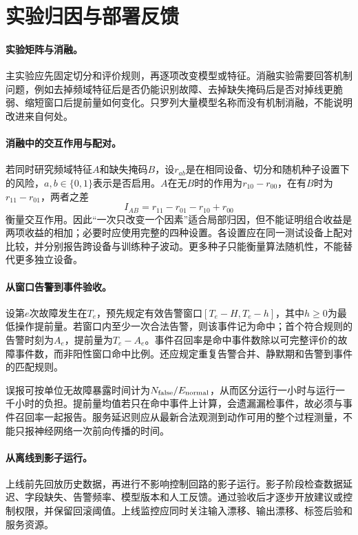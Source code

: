 \section{实验归因与部署反馈}
\paragraph{实验矩阵与消融。}
主实验应先固定切分和评价规则，再逐项改变模型或特征。消融实验需要回答机制问题，例如去掉频域特征后是否仍能识别故障、去掉缺失掩码后是否对掉线更脆弱、缩短窗口后提前量如何变化。只罗列大量模型名称而没有机制消融，不能说明改进来自何处。

\paragraph{消融中的交互作用与配对。}
若同时研究频域特征$A$和缺失掩码$B$，设$r_{ab}$是在相同设备、切分和随机种子设置下的风险，$a,b\in\{0,1\}$表示是否启用。$A$在无$B$时的作用为$r_{10}-r_{00}$，在有$B$时为$r_{11}-r_{01}$，两者之差
\begin{equation}
 I_{AB}=r_{11}-r_{01}-r_{10}+r_{00}
\end{equation}
衡量交互作用。因此“一次只改变一个因素”适合局部归因，但不能证明组合收益是两项收益的相加；必要时应使用完整的四种设置。各设置应在同一测试设备上配对比较，并分别报告跨设备与训练种子波动。更多种子只能衡量算法随机性，不能替代更多独立设备。

\paragraph{从窗口告警到事件验收。}
设第$e$次故障发生在$T_e$，预先规定有效告警窗口$[T_e-H,T_e-h]$，其中$h\geq0$为最低操作提前量。若窗口内至少一次合法告警，则该事件记为命中；首个符合规则的告警时刻为$A_e$，提前量为$T_e-A_e$。事件召回率是命中事件数除以可完整评价的故障事件数，而非阳性窗口命中比例。还应规定重复告警合并、静默期和告警到事件的匹配规则。

误报可按单位无故障暴露时间计为$N_{\rm false}/E_{\rm normal}$，从而区分运行一小时与运行一千小时的负担。提前量均值若只在命中事件上计算，会遗漏漏检事件，故必须与事件召回率一起报告。服务延迟则应从最新合法观测到动作可用的整个过程测量，不能只报神经网络一次前向传播的时间。

\paragraph{从离线到影子运行。}
上线前先回放历史数据，再进行不影响控制回路的影子运行。影子阶段检查数据延迟、字段缺失、告警频率、模型版本和人工反馈。通过验收后才逐步开放建议或控制权限，并保留回滚阈值。上线监控应同时关注输入漂移、输出漂移、标签后验和服务资源。

